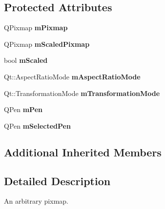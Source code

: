 \subsection*{Protected Attributes}
\begin{DoxyCompactItemize}
\item 
\hypertarget{classQCPItemPixmap_a1396cce7f26c7b8e9512906284380c4d}{}Q\+Pixmap {\bfseries m\+Pixmap}\label{classQCPItemPixmap_a1396cce7f26c7b8e9512906284380c4d}

\item 
\hypertarget{classQCPItemPixmap_a2ebc66e15b9f1264563d58f29ba1bc00}{}Q\+Pixmap {\bfseries m\+Scaled\+Pixmap}\label{classQCPItemPixmap_a2ebc66e15b9f1264563d58f29ba1bc00}

\item 
\hypertarget{classQCPItemPixmap_a8fe670a529cd46a9b8afd9fc1203bc3f}{}bool {\bfseries m\+Scaled}\label{classQCPItemPixmap_a8fe670a529cd46a9b8afd9fc1203bc3f}

\item 
\hypertarget{classQCPItemPixmap_a8dc6b6c1e106ac523efae22d5fe55bab}{}Qt\+::\+Aspect\+Ratio\+Mode {\bfseries m\+Aspect\+Ratio\+Mode}\label{classQCPItemPixmap_a8dc6b6c1e106ac523efae22d5fe55bab}

\item 
\hypertarget{classQCPItemPixmap_ac9ecad3b9842363754e32eda2cf821bd}{}Qt\+::\+Transformation\+Mode {\bfseries m\+Transformation\+Mode}\label{classQCPItemPixmap_ac9ecad3b9842363754e32eda2cf821bd}

\item 
\hypertarget{classQCPItemPixmap_acfee1124eb51a1887aaf8de10777c7a1}{}Q\+Pen {\bfseries m\+Pen}\label{classQCPItemPixmap_acfee1124eb51a1887aaf8de10777c7a1}

\item 
\hypertarget{classQCPItemPixmap_a0949e5bb6a261fc4e9668e28e2effcfa}{}Q\+Pen {\bfseries m\+Selected\+Pen}\label{classQCPItemPixmap_a0949e5bb6a261fc4e9668e28e2effcfa}

\end{DoxyCompactItemize}
\subsection*{Additional Inherited Members}


\subsection{Detailed Description}
An arbitrary pixmap. 

